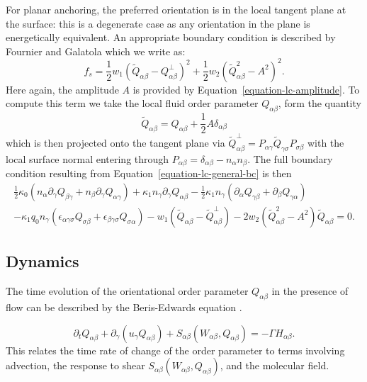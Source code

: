For planar anchoring, the preferred orientation is in the local tangent
plane at the surface: this is a degenerate case as any orientation in
the plane is energetically equivalent. An appropriate boundary
condition is described by Fournier and Galatola \cite{fournier2005}
which we write as:
\begin{equation}
f_s =
{\textstyle\frac{1}{2}} w_1 (\tilde{Q}_{\alpha\beta} - Q^\perp_{\alpha\beta})^2
+ {\textstyle\frac{1}{2}} w_2 (\tilde{Q}_{\alpha\beta}^2 - A^2)^2.
\end{equation}
Here again, the amplitude $A$ is provided by
Equation~\ref{equation-lc-amplitude}. To compute this term we take
the local fluid order parameter $Q_{\alpha\beta}$, form the quantity
$$
\tilde{Q}_{\alpha\beta}
= Q_{\alpha\beta} + {\textstyle \frac{1}{2}A\delta_{\alpha\beta} }
$$
which is then projected onto the tangent plane via
$
\tilde{Q}^\perp_{\alpha\beta}
= P_{\alpha\gamma} \tilde{Q}_{\gamma\sigma} P_{\sigma\beta}
$
with the local surface normal entering through
$P_{\alpha\beta} = \delta_{\alpha\beta} - n_\alpha n_\beta$.
The full boundary condition resulting from
Equation~\ref{equation-lc-general-bc} is then
\begin{eqnarray}
{\textstyle\frac{1}{2}} \kappa_0 (n_\alpha \partial_\gamma Q_{\beta\gamma}
+ n_\beta \partial_\gamma Q_{\alpha\gamma})
+ \kappa_1 n_\gamma \partial_\gamma Q_{\alpha\beta}
- {\textstyle\frac{1}{2}} \kappa_1 n_\gamma ( \partial_\alpha Q_{\gamma\beta}
+ \partial_\beta Q_{\gamma\alpha})
\nonumber
\\
- \kappa_1 q_0 n_\gamma (\epsilon_{\alpha\gamma\sigma} Q_{\sigma\beta}
+ \epsilon_{\beta\gamma\sigma}Q_{\sigma\alpha})
- w_1 (\tilde{Q}_{\alpha\beta} - \tilde{Q}_{\alpha\beta}^\perp)
- 2w_2(\tilde{Q}_{\alpha\beta}^2 - A^2)\tilde{Q}_{\alpha\beta} = 0.
\label{equation-lc-bc-planar}
\end{eqnarray}



\subsection{Dynamics}

The time evolution of the orientational order parameter $Q_{\alpha\beta}$
in the presence of flow can be described by the Beris-Edwards equation
\cite{beris-edwards}.

\begin{equation}
\partial_t Q_{\alpha\beta} + \partial_\gamma (u_\gamma Q_{\alpha\beta})
+ S_{\alpha\beta}(W_{\alpha\beta}, Q_{\alpha\beta}) = -\Gamma  H_{\alpha\beta}.
\label{equation-lc-beris-edwards}
\end{equation}
This relates the time rate of change of the order parameter to terms
involving advection, the response to shear
$S_{\alpha\beta}(W_{\alpha\beta},Q_{\alpha\beta})$, and the molecular
field.

